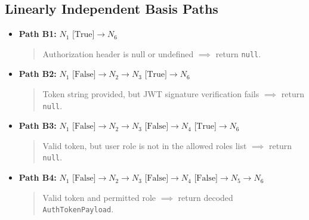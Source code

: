 \documentclass[11pt,a4paper]{article}
\begin{document}
\subsection{Linearly Independent Basis Paths}
\begin{itemize}
    \item \textbf{Path B1:} $N_1 \text{ [True]} \to N_6$
    \begin{quote}Authorization header is null or undefined $\implies$ return \texttt{null}.\end{quote}
    \item \textbf{Path B2:} $N_1 \text{ [False]} \to N_2 \to N_3 \text{ [True]} \to N_6$
    \begin{quote}Token string provided, but JWT signature verification fails $\implies$ return \texttt{null}.\end{quote}
    \item \textbf{Path B3:} $N_1 \text{ [False]} \to N_2 \to N_3 \text{ [False]} \to N_4 \text{ [True]} \to N_6$
    \begin{quote}Valid token, but user role is not in the allowed roles list $\implies$ return \texttt{null}.\end{quote}
    \item \textbf{Path B4:} $N_1 \text{ [False]} \to N_2 \to N_3 \text{ [False]} \to N_4 \text{ [False]} \to N_5 \to N_6$
    \begin{quote}Valid token and permitted role $\implies$ return decoded \texttt{AuthTokenPayload}.\end{quote}
\end{itemize}
\end{document}
